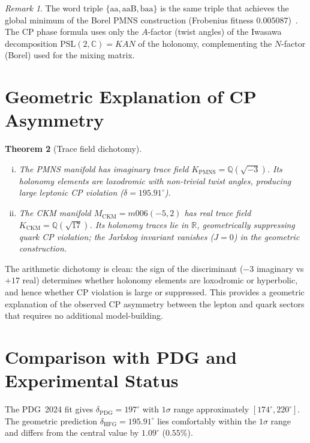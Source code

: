 \documentclass[11pt,a4paper]{article}
\newtheorem{theorem}{Theorem}
\theoremstyle{remark}
\newtheorem{remark}[theorem]{Remark}
\newcommand{\KPMNS}{K_{\mathrm{PMNS}}}
\newcommand{\PSL}{\mathrm{PSL}(2,\mathbb{C})}
\begin{document}
\begin{remark}
The word triple $\{\mathrm{aa},\mathrm{aaB},\mathrm{baa}\}$ is the
same triple that achieves the global minimum of the Borel PMNS
construction (Frobenius fitness $0.005087$)~\cite{Gentry:PMNS}.
The CP phase formula uses only the $A$-factor (twist angles) of the
Iwasawa decomposition $\PSL=KAN$ of the holonomy, complementing
the $N$-factor (Borel) used for the mixing matrix.
\end{remark}

\section{Geometric Explanation of CP Asymmetry}
\label{sec:asymmetry}

\begin{theorem}[Trace field dichotomy]
\label{thm:dichotomy}
\begin{enumerate}[(i)]
\item The PMNS manifold has imaginary trace field
  $\KPMNS=\mathbb{Q}(\sqrt{-3})$.
  Its holonomy elements are loxodromic with non-trivial twist angles,
  producing large leptonic CP violation ($\delta=195.91^\circ$).
\item The CKM manifold $M_{\mathrm{CKM}}=m006(-5,2)$ has real
  trace field $K_{\mathrm{CKM}}=\mathbb{Q}(\sqrt{17})$.
  Its holonomy traces lie in $\mathbb{R}$, geometrically suppressing
  quark CP violation; the Jarlskog invariant vanishes ($J=0$) in
  the geometric construction.
\end{enumerate}
\end{theorem}

The arithmetic dichotomy is clean: the sign of the discriminant
($-3$ imaginary vs $+17$ real) determines whether holonomy elements
are loxodromic or hyperbolic, and hence whether CP violation is
large or suppressed. This provides a geometric explanation of the
observed CP asymmetry between the lepton and quark sectors that
requires no additional model-building.

\section{Comparison with PDG and Experimental Status}
\label{sec:comparison}

The PDG~2024 fit gives $\delta_{\mathrm{PDG}}=197^\circ$ with
$1\sigma$ range approximately $[174^\circ,220^\circ]$.
The geometric prediction $\delta_{\mathrm{HFG}}=195.91^\circ$
lies comfortably within the $1\sigma$ range and differs from the
central value by $1.09^\circ$ ($0.55\%$).
\end{document}
